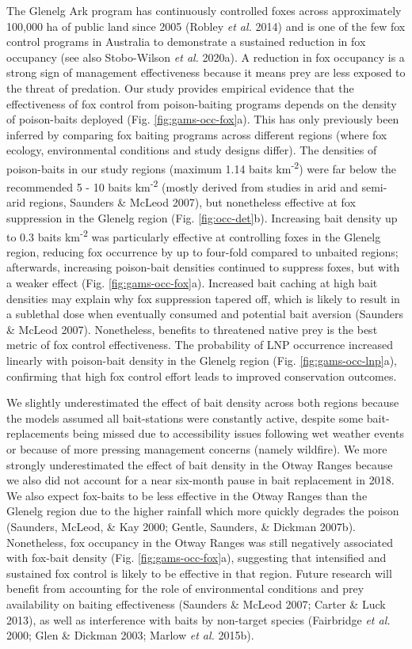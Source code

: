 \documentclass[11pt,a4paper,titlepage,twoside,openright]{style/unimelbthesis}
\begin{document}
\begin{mainmatter}
The Glenelg Ark program has continuously controlled foxes across approximately 100,000 ha of public land since 2005 (Robley \emph{et al.} 2014) and is one of the few fox control programs in Australia to demonstrate a sustained reduction in fox occupancy (see also Stobo-Wilson \emph{et al.} 2020a). A reduction in fox occupancy is a strong sign of management effectiveness because it means prey are less exposed to the threat of predation. Our study provides empirical evidence that the effectiveness of fox control from poison-baiting programs depends on the density of poison-baits deployed (Fig. \ref{fig:gams-occ-fox}a). This has only previously been inferred by comparing fox baiting programs across different regions (where fox ecology, environmental conditions and study designs differ). The densities of poison-baits in our study regions (maximum 1.14 baits km\textsuperscript{-2}) were far below the recommended 5 - 10 baits km\textsuperscript{-2} (mostly derived from studies in arid and semi-arid regions, Saunders \& McLeod 2007), but nonetheless effective at fox suppression in the Glenelg region (Fig. \ref{fig:occ-det}b). Increasing bait density up to 0.3 baits km\textsuperscript{-2} was particularly effective at controlling foxes in the Glenelg region, reducing fox occurrence by up to four-fold compared to unbaited regions; afterwards, increasing poison-bait densities continued to suppress foxes, but with a weaker effect (Fig. \ref{fig:gams-occ-fox}a). Increased bait caching at high bait densities may explain why fox suppression tapered off, which is likely to result in a sublethal dose when eventually consumed and potential bait aversion (Saunders \& McLeod 2007). Nonetheless, benefits to threatened native prey is the best metric of fox control effectiveness. The probability of LNP occurrence increased linearly with poison-bait density in the Glenelg region (Fig. \ref{fig:gams-occ-lnp}a), confirming that high fox control effort leads to improved conservation outcomes.

We slightly underestimated the effect of bait density across both regions because the models assumed all bait-stations were constantly active, despite some bait-replacements being missed due to accessibility issues following wet weather events or because of more pressing management concerns (namely wildfire). We more strongly underestimated the effect of bait density in the Otway Ranges because we also did not account for a near six-month pause in bait replacement in 2018. We also expect fox-baits to be less effective in the Otway Ranges than the Glenelg region due to the higher rainfall which more quickly degrades the poison (Saunders, McLeod, \& Kay 2000; Gentle, Saunders, \& Dickman 2007b). Nonetheless, fox occupancy in the Otway Ranges was still negatively associated with fox-bait density (Fig. \ref{fig:gams-occ-fox}a), suggesting that intensified and sustained fox control is likely to be effective in that region. Future research will benefit from accounting for the role of environmental conditions and prey availability on baiting effectiveness (Saunders \& McLeod 2007; Carter \& Luck 2013), as well as interference with baits by non-target species (Fairbridge \emph{et al.} 2000; Glen \& Dickman 2003; Marlow \emph{et al.} 2015b).


\end{mainmatter}
\end{document}
